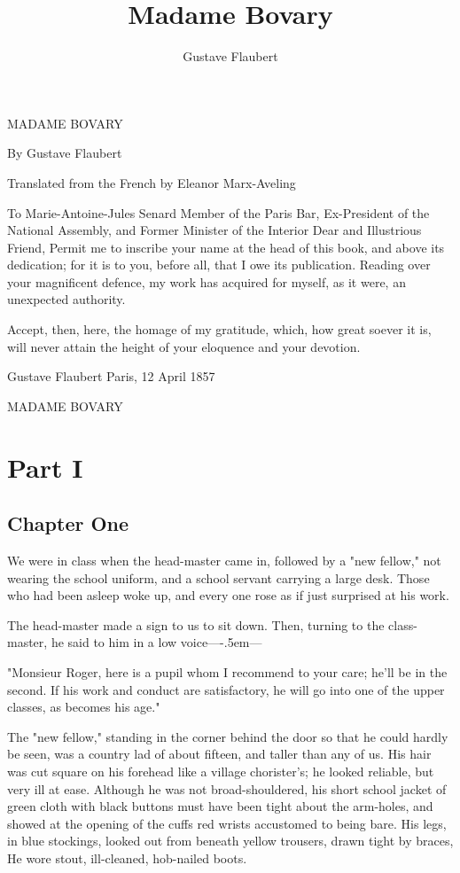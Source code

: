 \documentclass{tufte-book}
\title{Madame Bovary }
\author{Gustave Flaubert}
\newcommand\hemdash{\hbox{---}\kern-.5em---}
\begin{document}
\maketitle


MADAME BOVARY

By Gustave Flaubert

Translated from the French by Eleanor Marx-Aveling


To Marie-Antoine-Jules Senard Member of the Paris Bar, Ex-President
of the National Assembly, and Former Minister of the Interior Dear and
Illustrious Friend, Permit me to inscribe your name at the head of this
book, and above its dedication; for it is to you, before all, that I
owe its publication. Reading over your magnificent defence, my work has
acquired for myself, as it were, an unexpected authority.

Accept, then, here, the homage of my gratitude, which, how great soever
it is, will never attain the height of your eloquence and your devotion.

Gustave Flaubert Paris, 12 April 1857




MADAME BOVARY




\part*{Part I}



\chapter*{Chapter One}

We were in class when the head-master came in, followed by a "new
fellow," not wearing the school uniform, and a school servant carrying a
large desk. Those who had been asleep woke up, and every one rose as if
just surprised at his work.

The head-master made a sign to us to sit down. Then, turning to the
class-master, he said to him in a low voice\hemdash

"Monsieur Roger, here is a pupil whom I recommend to your care; he'll be
in the second. If his work and conduct are satisfactory, he will go into
one of the upper classes, as becomes his age."

The "new fellow," standing in the corner behind the door so that he
could hardly be seen, was a country lad of about fifteen, and taller
than any of us. His hair was cut square on his forehead like a village
chorister's; he looked reliable, but very ill at ease. Although he was
not broad-shouldered, his short school jacket of green cloth with black
buttons must have been tight about the arm-holes, and showed at the
opening of the cuffs red wrists accustomed to being bare. His legs, in
blue stockings, looked out from beneath yellow trousers, drawn tight by
braces, He wore stout, ill-cleaned, hob-nailed boots.
\end{document}

